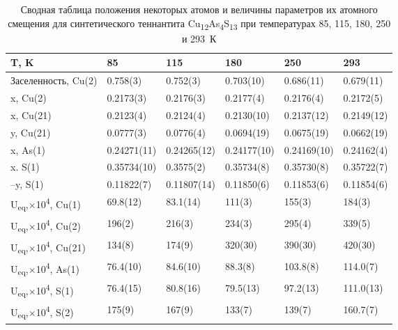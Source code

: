 \begin{landscape}
\begin{table} [htbp]
\centering
\caption{Сводная таблица положения некоторых атомов и величины параметров их атомного смещения для синтетического теннантита Cu\textsubscript{12}As\textsubscript{4}S\textsubscript{13} при температурах 85, 115, 180, 250 и 293~К}%
	\label{xray2}%
    \renewcommand{\arraystretch}{1.5}
	\begin{tabular}{@{}@{\extracolsep{20pt}}llllll@{}}
 \toprule     %
T, K             	          & 85 	         & 115  	       & 180    	     & 250    	     & 293         \\
   \midrule
Заселенность, Cu(2) & 0.758(3)    & 0.752(3)    	 & 0.703(10)     & 0.686(11)    & 0.679(11)    \\
x, Cu(2)         		 & 0.2173(3)   & 0.2176(3)   	 & 0.2177(4)   	& 0.2176(4)   & 0.2172(5) \\
x, Cu(21)        		 & 0.2123(4)   & 0.2124(4)   	 & 0.2130(10)   & 0.2137(12)   & 0.2149(12)   \\
y, Cu(21)       		 & 0.0777(3)   & 0.0776(4)   	 & 0.0694(19)   & 0.0675(19)   & 0.0662(19)   \\
x, As(1)         		& 0.24271(11)  & 0.24265(12)  	 & 0.24177(10)  & 0.24169(10)  & 0.24162(4)  \\
x. S(1)          		& 0.35734(10) & 0.3575(2) 	 & 0.35734(8)  & 0.35730(8)  & 0.35722(7)  \\
–y, S(1)         		 & 0.11822(7) & 0.11807(14)	 & 0.11850(6) 	& 0.11853(6) & 0.11854(6) \\
U\textsubscript{eq},$ \times$10\textsuperscript{4}, Cu(1)   & 69.8(12)       & 83.1(14)       & 111(3)      	    & 155(3)       & 184(3)      \\
U\textsubscript{eq},$ \times$10\textsuperscript{4}, Cu(2)   & 196(2)   	& 216(3)          & 234(3)         & 295(4)       & 339(5)      \\
U\textsubscript{eq},$ \times$10\textsuperscript{4}, Cu(21)  & 134(8)      	& 174(9)          & 320(30)       & 390(30)     & 420(30)     \\
U\textsubscript{eq},$ \times$10\textsuperscript{4}, As(1)   & 76.4(10)     	& 84.6(10)      & 88.3(8)         & 103.8(8)    & 114.0(7)    \\
U\textsubscript{eq},$ \times$10\textsuperscript{4}, S(1)    & 76.4(15)    	& 80.8(16)      & 79.5(13)        & 97.2(13)    & 111.0(13)   \\
U\textsubscript{eq},$ \times$10\textsuperscript{4}, S(2)    & 175(9)      	& 167(9)         & 133(7)  	     & 139(7)       & 160.7(7)  \\ \hline
 \bottomrule
\end{tabular}
\end{table}
\end{landscape}

